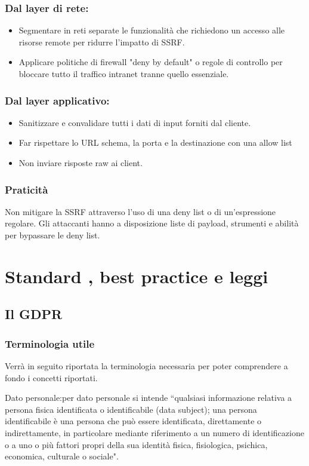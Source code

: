 \subsubsection{Dal layer di rete:}
\begin{itemize}
    \item Segmentare in reti separate le funzionalità che richiedono un accesso alle risorse remote per ridurre l'impatto di SSRF.
    \item Applicare politiche di firewall "deny by default" o regole di controllo per bloccare tutto il traffico intranet tranne quello essenziale.
\end{itemize}
\subsubsection{Dal layer applicativo:}
\begin{itemize}
    \item Sanitizzare e convalidare tutti i dati di input forniti dal cliente.
    \item Far rispettare lo URL schema, la porta e la destinazione con una allow list
    \item Non inviare risposte raw ai client.
\end{itemize}
\subsubsection{Praticità}
Non mitigare la SSRF attraverso l'uso di una deny list o di un'espressione regolare. Gli attaccanti hanno a disposizione liste di payload, strumenti e abilità per bypassare le deny list.
\section{Standard , best practice e leggi }
\subsection{Il GDPR}
\subsubsection{Terminologia utile}
Verrà in seguito riportata la terminologia necessaria per poter comprendere a fondo i concetti riportati.

Dato personale:per dato personale si intende “qualsiasi informazione relativa a persona fisica identificata o identificabile (data subject); una persona identificabile è una persona che può essere identificata, direttamente o indirettamente, in particolare mediante riferimento a un numero di identificazione o a uno o più fattori propri della sua identità fisica, fisiologica, psichica, economica, culturale o sociale".

